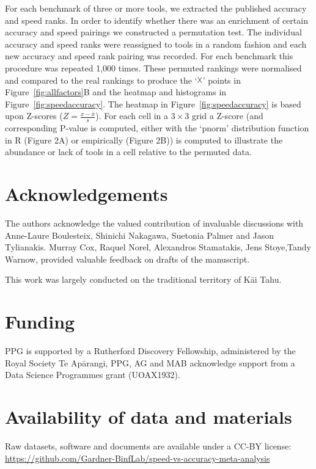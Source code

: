 \documentclass{bmcart}
\begin{document}
{For each benchmark of three or more tools, we extracted the published
accuracy and speed ranks. In order to identify whether there was an
enrichment of certain accuracy and speed pairings we constructed a
permutation test. The individual accuracy and speed ranks were
reassigned to tools in a random fashion and each new accuracy and
speed rank pairing was recorded. For each benchmark this procedure was
repeated 1,000 times. These permuted rankings were normalised and
compared to the real rankings to produce the ‘$\vartimes$’ points in
Figure~\ref{fig:allfactors}B and the heatmap and histograms in
Figure~\ref{fig:speedaccuracy}. The heatmap in
Figure~\ref{fig:speedaccuracy} is based upon Z-scores
($Z=\frac{x-\bar{x}}{s}$). For each cell in a $3\times 3$ grid
a Z-score (and corresponding P-value is computed, either with the `pnorm' distribution function in R (Figure 2A) or empirically (Figure 2B)) is computed to illustrate the abundance or lack of tools in
a cell relative to the permuted data.


\begin{backmatter}

\section*{Acknowledgements}
The authors acknowledge the valued contribution of invaluable
discussions with Anne-Laure Boulesteix, Shinichi Nakagawa, Suetonia
Palmer and Jason Tylianakis. Murray Cox, Raquel
Norel, Alexandros Stamatakis, Jens Stoye,Tandy Warnow, provided
valuable feedback on drafts of the manuscript.

This work was largely conducted on the traditional territory of K\=ai Tahu.

\section*{Funding}
PPG is supported by a Rutherford Discovery Fellowship,
administered by the Royal Society Te Ap\=arangi, 
PPG, AG and MAB acknowledge support from a Data Science Programmes grant
(UOAX1932).

\section*{Availability of data and materials}
Raw datasets, software and documents are available under a CC-BY license:\\
\fussy
\url{https://github.com/Gardner-BinfLab/speed-vs-accuracy-meta-analysis}
\sloppy


\end{backmatter}}
\end{document}
